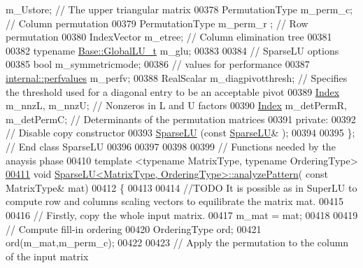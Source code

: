 \begin{DoxyCode}
      m\_Ustore; \textcolor{comment}{// The upper triangular matrix}
00378     PermutationType m\_perm\_c; \textcolor{comment}{// Column permutation }
00379     PermutationType m\_perm\_r ; \textcolor{comment}{// Row permutation}
00380     IndexVector m\_etree; \textcolor{comment}{// Column elimination tree }
00381     
00382     \textcolor{keyword}{typename} \hyperlink{struct_eigen_1_1internal_1_1_l_u___global_l_u__t}{Base::GlobalLU\_t} m\_glu; 
00383                                
00384     \textcolor{comment}{// SparseLU options }
00385     \textcolor{keywordtype}{bool} m\_symmetricmode;
00386     \textcolor{comment}{// values for performance }
00387     \hyperlink{struct_eigen_1_1internal_1_1perfvalues}{internal::perfvalues} m\_perfv;
00388     RealScalar m\_diagpivotthresh; \textcolor{comment}{// Specifies the threshold used for a diagonal entry to be an acceptable
       pivot}
00389     \hyperlink{namespace_eigen_a62e77e0933482dafde8fe197d9a2cfde}{Index} m\_nnzL, m\_nnzU; \textcolor{comment}{// Nonzeros in L and U factors}
00390     \hyperlink{namespace_eigen_a62e77e0933482dafde8fe197d9a2cfde}{Index} m\_detPermR, m\_detPermC; \textcolor{comment}{// Determinants of the permutation matrices}
00391   \textcolor{keyword}{private}:
00392     \textcolor{comment}{// Disable copy constructor }
00393     \hyperlink{group___sparse_l_u___module_class_eigen_1_1_sparse_l_u}{SparseLU} (\textcolor{keyword}{const} \hyperlink{group___sparse_l_u___module_class_eigen_1_1_sparse_l_u}{SparseLU}& );
00394   
00395 \}; \textcolor{comment}{// End class SparseLU}
00396 
00397 
00398 
00399 \textcolor{comment}{// Functions needed by the anaysis phase}
00410 \textcolor{comment}{}\textcolor{keyword}{template} <\textcolor{keyword}{typename} MatrixType, \textcolor{keyword}{typename} OrderingType>
\hyperlink{group___sparse_l_u___module_aa907ff958c4f4855145091d2686f3a8a}{00411} \textcolor{keywordtype}{void} \hyperlink{group___sparse_l_u___module_aa907ff958c4f4855145091d2686f3a8a}{SparseLU<MatrixType, OrderingType>::analyzePattern}(\textcolor{keyword}{
      const} MatrixType& mat)
00412 \{
00413   
00414   \textcolor{comment}{//TODO  It is possible as in SuperLU to compute row and columns scaling vectors to equilibrate the matrix
       mat.}
00415   
00416   \textcolor{comment}{// Firstly, copy the whole input matrix. }
00417   m\_mat = mat;
00418   
00419   \textcolor{comment}{// Compute fill-in ordering}
00420   OrderingType ord; 
00421   ord(m\_mat,m\_perm\_c);
00422   
00423   \textcolor{comment}{// Apply the permutation to the column of the input  matrix}

\end{DoxyCode}
